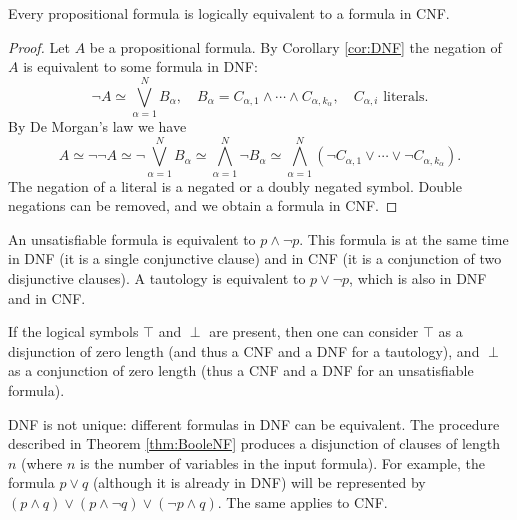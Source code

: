 \begin{page}

\begin{thm}
Every propositional formula is logically equivalent to a formula in CNF.
\end{thm}

\end{page}

\begin{page}

\begin{proof}
Let $A$ be a propositional formula.
By Corollary \ref{cor:DNF} the negation of $A$ is equivalent to some formula in DNF:
\[
\neg A \simeq \bigvee_{\alpha = 1}^N B_\alpha, \quad B_\alpha = C_{\alpha,1} \wedge \cdots \wedge C_{\alpha,k_{\alpha}}, \quad C_{\alpha,i} \text{ literals}.
\]
By De Morgan's law we have
\[
A \simeq \neg\neg A \simeq \neg \bigvee_{\alpha = 1}^N B_\alpha \simeq \bigwedge_{\alpha = 1}^N \neg B_\alpha
\simeq \bigwedge_{\alpha = 1}^N (\neg C_{\alpha,1} \vee \cdots \vee \neg C_{\alpha,k_{\alpha}}).
\]
The negation of a literal is a negated or a doubly negated symbol.
Double negations can be removed, and we obtain a formula in CNF.
\end{proof}

An unsatisfiable formula is equivalent to $p \wedge \neg p$.
This formula is at the same time in DNF (it is a single conjunctive clause) and in CNF (it is a conjunction of two disjunctive clauses).
A tautology is equivalent to $p \vee \neg p$, which is also in DNF and in CNF.


\end{page}

\begin{page}

\begin{rem}
If the logical symbols $\top$ and $\perp$ are present, then one can consider $\top$ as a disjunction of zero length
(and thus a CNF and a DNF for a tautology), and $\perp$ as a conjunction of zero length (thus a CNF and a DNF for an unsatisfiable formula).
\end{rem}

\end{page}

\begin{page}


DNF is not unique: different formulas in DNF can be equivalent.
The procedure described in Theorem \ref{thm:BooleNF} produces a disjunction of clauses of length $n$ (where $n$ is the number of variables in the input formula).
For example, the formula $p \vee q$ (although it is already in DNF) will be represented by $(p \wedge q) \vee (p \wedge \neg q) \vee (\neg p \wedge q)$.
The same applies to CNF.




\end{page}

